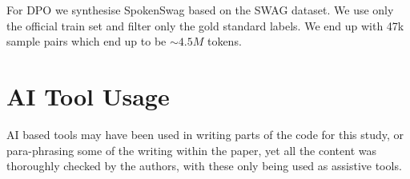 For DPO we synthesise SpokenSwag based on the SWAG \cite{swag} dataset. We use only the official train set and filter only the gold standard labels. We end up with 47k sample pairs which end up to be $\sim 4.5M$ tokens.

\section{AI Tool Usage}
AI based tools may have been used in writing parts of the code for this study, or para-phrasing some of the writing within the paper, yet all the content was thoroughly checked by the authors, with these only being used as assistive tools.
